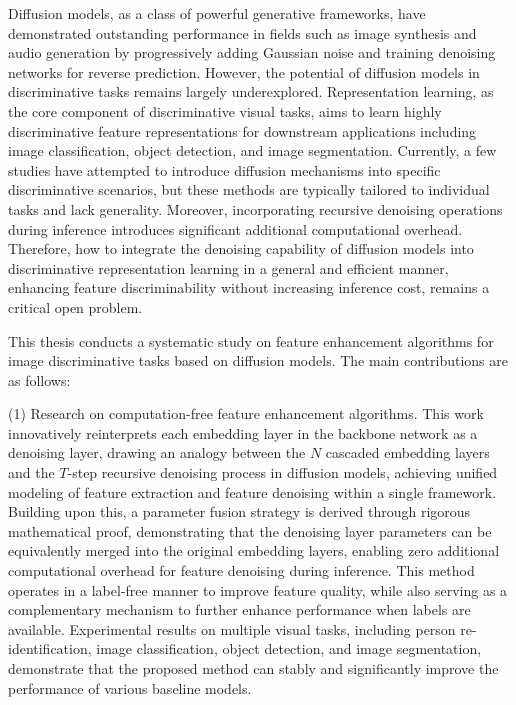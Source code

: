 ﻿\setlength{\baselineskip}{20pt}
\begin{englishabstract}

Diffusion models, as a class of powerful generative frameworks, have demonstrated outstanding performance in fields such as image synthesis and audio generation by progressively adding Gaussian noise and training denoising networks for reverse prediction. However, the potential of diffusion models in discriminative tasks remains largely underexplored. Representation learning, as the core component of discriminative visual tasks, aims to learn highly discriminative feature representations for downstream applications including image classification, object detection, and image segmentation. Currently, a few studies have attempted to introduce diffusion mechanisms into specific discriminative scenarios, but these methods are typically tailored to individual tasks and lack generality. Moreover, incorporating recursive denoising operations during inference introduces significant additional computational overhead. Therefore, how to integrate the denoising capability of diffusion models into discriminative representation learning in a general and efficient manner, enhancing feature discriminability without increasing inference cost, remains a critical open problem.

This thesis conducts a systematic study on feature enhancement algorithms for image discriminative tasks based on diffusion models. The main contributions are as follows:

(1) Research on computation-free feature enhancement algorithms. This work innovatively reinterprets each embedding layer in the backbone network as a denoising layer, drawing an analogy between the $N$ cascaded embedding layers and the $T$-step recursive denoising process in diffusion models, achieving unified modeling of feature extraction and feature denoising within a single framework. Building upon this, a parameter fusion strategy is derived through rigorous mathematical proof, demonstrating that the denoising layer parameters can be equivalently merged into the original embedding layers, enabling zero additional computational overhead for feature denoising during inference. This method operates in a label-free manner to improve feature quality, while also serving as a complementary mechanism to further enhance performance when labels are available. Experimental results on multiple visual tasks, including person re-identification, image classification, object detection, and image segmentation, demonstrate that the proposed method can stably and significantly improve the performance of various baseline models.


\end{englishabstract}
